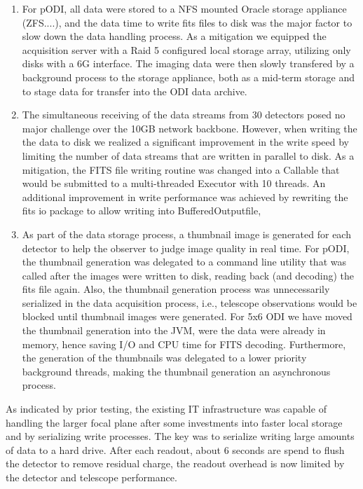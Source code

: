 \documentclass[draft]{spieman}
\begin{document}
\begin{enumerate} 
    
\item For pODI, all data were stored to a NFS mounted Oracle storage appliance
(ZFS....), and the data time to write fits files to disk was the major factor to
slow down the data handling process. As a mitigation we equipped the acquisition
server with a Raid 5 configured local storage array, utilizing only disks with a
6G interface. The imaging data were then slowly transfered by a background
process to the storage appliance, both as a mid-term storage and to stage data
for transfer into the ODI data archive.

\item  The simultaneous receiving of the data streams from 30 detectors posed no
major challenge over the 10GB network backbone.  However, when writing the the
data to disk we realized a significant  improvement in the write speed by
limiting the number of data streams that are written in parallel to disk. As a
mitigation, the FITS file writing routine was changed into a Callable that would
be submitted to a multi-threaded Executor with 10 threads. An additional
improvement in write performance was achieved by rewriting the fits io package
to allow writing into BufferedOutputfile,

\item As part of the data storage process, a thumbnail image is generated for
each detector to help the observer to judge image quality in real time. For
pODI, the thumbnail generation was delegated to a command line utility that was
called after the images were written to disk, reading back (and decoding) the
fits file again. Also, the thumbnail generation process was unnecessarily
serialized in the data acquisition process, i.e., telescope observations would
be blocked until thumbnail images were generated.  For 5x6 ODI we have moved the
thumbnail generation into the JVM, were the data were already in memory, hence
saving I/O and CPU time for FITS decoding. Furthermore, the generation of the
thumbnails was delegated to a lower priority background threads, making the
thumbnail generation an asynchronous process.

    
\end{enumerate}

As indicated by prior testing, the existing IT infrastructure was capable of
handling the larger focal plane after some investments into faster local
storage and by serializing write processes. The key was to serialize writing
large amounts of data to a hard drive. After each readout, about 6 seconds
are spend to flush the detector to remove residual charge, the readout
overhead is now limited by the detector and telescope performance.
\end{document}
